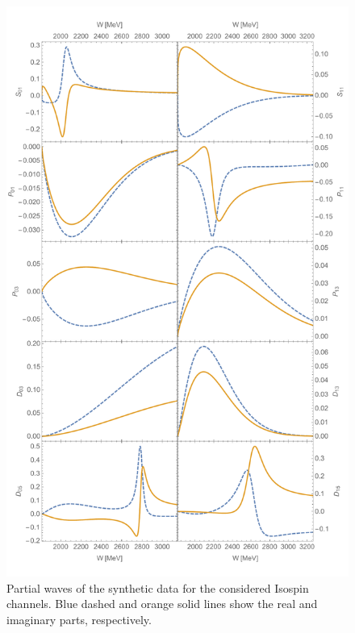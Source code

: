 \documentclass[aps, prd, twocolumn, showpacs, superscriptaddress,
preprintnumbers, nofootinbib]{revtex4-1}
\begin{document}
\begin{figure}
\begin{center}
\includegraphics[width=0.99\linewidth,trim=0 1cm 0 3cm]{Fig2.pdf}
\end{center}
\caption{Partial waves of the synthetic data for the considered Isospin channels. Blue dashed and orange solid lines show the real and imaginary parts, respectively.}
\label{fig:Fig1}
\end{figure}
\end{document}
